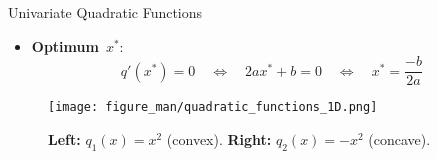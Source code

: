 \documentclass[11pt,compress,t,notes=noshow, xcolor=table]{beamer}
\begin{document}
\begin{vbframe}{Univariate Quadratic Functions}
\begin{itemize}
    \item \textbf{Optimum}~$x^\ast$:
        \vspace{-0.5\baselineskip}
        \begin{equation*}
            q'(x^\ast) = 0 \quad\Leftrightarrow \quad 2ax^\ast + b = 0 \quad \Leftrightarrow \quad x^\ast = \frac{-b}{2a}  	
        \end{equation*}
\end{itemize}

\vspace{-0.5\baselineskip}

\begin{figure}
    \centering
    \texttt{[image: figure\_man/quadratic\_functions\_1D.png]}
    \caption*{\textbf{Left:} $q_1(x) = x^2$ (convex).
        \textbf{Right:} $q_2(x) = - x^2$ (concave).}
\end{figure}

\end{vbframe}
  
\end{document}
